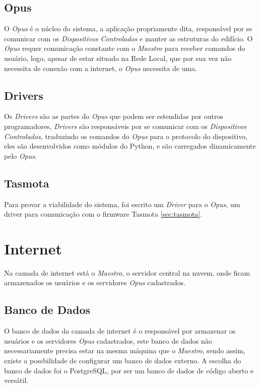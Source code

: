 \subsection{Opus}
\label{arq-subsubsec:rede-local-opus}
O \emph{Opus} é o núcleo do sistema, a aplicação propriamente dita, responsável por se comunicar
com os \emph{Dispositivos Controlados} e manter as estruturas do edifício. O \emph{Opus} requer comunicação
constante com o \emph{Maestro} para receber comandos do usuário, logo, apesar de estar situado na Rede Local, que
por sua vez não necessita de conexão com a internet, o \emph{Opus} necessita de uma.

\subsection{Drivers}
\label{arq-subsubsec:rede-local-drivers}
Os \emph{Drivers} são as partes do \emph{Opus} que podem ser estendidas por outros programadores,
\emph{Drivers} são responsáveis por se comunicar com os \emph{Dispositivos Controlados}, traduzindo
os comandos do \emph{Opus} para o protocolo do dispositivo, eles são desenvolvidos como módulos do 
Python, e são carregados dinamicamente pelo \emph{Opus}.

\subsection{Tasmota}
\label{arq-subsec:rede-local-tasmota}
Para provar a viabilidade do sistema, foi escrito um \emph{Driver} para o \emph{Opus},
um driver para comunicação com o firmware Tasmota \ref{sec:tasmota}.


\section{Internet}
\label{arq-subsec:internet}
Na camada de internet está o \emph{Maestro}, o servidor central na nuvem, onde ficam armazenados
os usuários e os servidores \emph{Opus} cadastrados.

\subsection{Banco de Dados}
\label{arq-subsubsec:internet-banco-dados}
O banco de dados da camada de internet é o responsável por armazenar os usuários e os servidores
\emph{Opus} cadastrados, este banco de dados não necessariamente precisa estar na mesma máquina
que o \emph{Maestro}, sendo assim, existe a possbilidade de configurar um banco de dados externo.
A escolha do banco de dados foi o PostgreSQL, por ser um banco de dados de código aberto e versátil.

